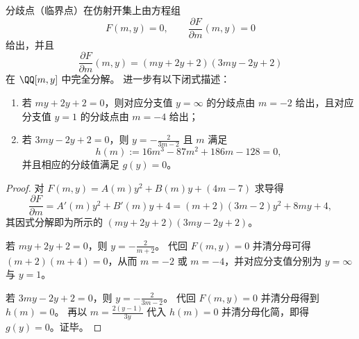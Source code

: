 \begin{proposition}\label{prop:xi-ed-Fm-complete-factorization-and-branchpoints}
分歧点（临界点）在仿射开集上由方程组
\[
F(m,y)=0,\qquad \frac{\partial F}{\partial m}(m,y)=0
\]
给出，并且
\[
\frac{\partial F}{\partial m}(m,y)=(my+2y+2)(3my-2y+2)
\]
在 \(\QQ[m,y]\) 中完全分解。
进一步有以下闭式描述：
\begin{enumerate}
  \item 若 \(my+2y+2=0\)，则对应分支值 \(y=\infty\) 的分歧点由 \(m=-2\) 给出，且对应分支值 \(y=1\) 的分歧点由 \(m=-4\) 给出；
  \item 若 \(3my-2y+2=0\)，则 \(y=-\frac{2}{3m-2}\) 且 \(m\) 满足
  \[
  h(m):=16m^3-87m^2+186m-128=0,
  \]
  并且相应的分歧值满足 \(g(y)=0\)。
\end{enumerate}
\end{proposition}
\begin{proof}
对 \(F(m,y)=A(m)y^2+B(m)y+(4m-7)\) 求导得
\[
\frac{\partial F}{\partial m}
=A'(m)y^2+B'(m)y+4
=(m+2)(3m-2)y^2+8my+4,
\]
其因式分解即为所示的 \((my+2y+2)(3my-2y+2)\)。
\par
若 \(my+2y+2=0\)，则 \(y=-\frac{2}{m+2}\)。
代回 \(F(m,y)=0\) 并清分母可得 \((m+2)(m+4)=0\)，从而 \(m=-2\) 或 \(m=-4\)，并对应分支值分别为 \(y=\infty\) 与 \(y=1\)。
\par
若 \(3my-2y+2=0\)，则 \(y=-\frac{2}{3m-2}\)。
代回 \(F(m,y)=0\) 并清分母得到 \(h(m)=0\)。
再以 \(m=\frac{2(y-1)}{3y}\) 代入 \(h(m)=0\) 并清分母化简，即得 \(g(y)=0\)。证毕。
\end{proof}

